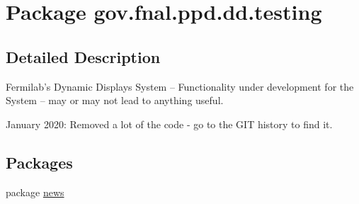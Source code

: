 \hypertarget{namespacegov_1_1fnal_1_1ppd_1_1dd_1_1testing}{\section{Package gov.\-fnal.\-ppd.\-dd.\-testing}
\label{namespacegov_1_1fnal_1_1ppd_1_1dd_1_1testing}
}


\subsection{Detailed Description}
Fermilab's Dynamic Displays System -- Functionality under development for the System -- may or may not lead to anything useful.

January 2020\-: Removed a lot of the code -\/ go to the G\-I\-T history to find it. \subsection*{Packages}
\begin{DoxyCompactItemize}
\item 
package \hyperlink{namespacegov_1_1fnal_1_1ppd_1_1dd_1_1testing_1_1news}{news}
\end{DoxyCompactItemize}
